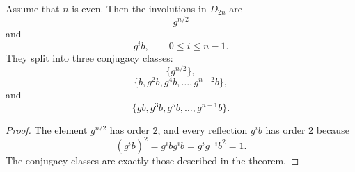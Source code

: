     \begin{corollary}
    Assume that $n$ is even. Then the involutions in $D_{2n}$ are
    \[
        g^{n/2}
    \]
    and
    \[
        g^i b,
        \qquad
        0\leq i\leq n-1.
    \]
    They split into three conjugacy classes:
    \[
        \{g^{n/2}\},
    \]
    \[
        \{b,g^2b,g^4b,\ldots,g^{n-2}b\},
    \]
    and
    \[
        \{gb,g^3b,g^5b,\ldots,g^{n-1}b\}.
    \]
    \end{corollary}
    
    \begin{proof}
    The element $g^{n/2}$ has order $2$, and every reflection $g^i b$ has order $2$ because
    \[
        (g^i b)^2
        =
        g^i b g^i b
        =
        g^i g^{-i}b^2
        =
        1.
    \]
    The conjugacy classes are exactly those described in the theorem.
    \end{proof}


